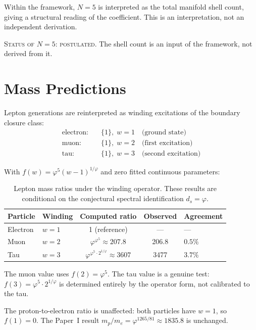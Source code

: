 \documentclass[12pt]{article}
\newcommand{\phig}{\varphi}
\newcommand{\ds}{d_s}
\begin{document}
Within the framework, $N = 5$ is interpreted as the total manifold shell count, giving a structural reading of the coefficient. This is an interpretation, not an independent derivation.

\textsc{Status of $N = 5$: postulated.} The shell count is an input of the framework, not derived from it.

\section{Mass Predictions}\label{sec:predictions}

Lepton generations are reinterpreted as winding excitations of the boundary closure class:
\begin{align}
    \text{electron:} \quad & \{1\},\; w = 1 \quad \text{(ground state)} \\
    \text{muon:} \quad & \{1\},\; w = 2 \quad \text{(first excitation)} \\
    \text{tau:} \quad & \{1\},\; w = 3 \quad \text{(second excitation)}
\end{align}

With $f(w) = \phig^5 (w{-}1)^{1/\phig}$ and zero fitted continuous parameters:

\begin{table}[ht]
\centering
\caption{Lepton mass ratios under the winding operator. These results are conditional on the conjectural spectral identification $\ds = \phig$.}
\label{tab:predictions}
\begin{tabular}{@{}llccl@{}}
\toprule
Particle & Winding & Computed ratio & Observed & Agreement \\
\midrule
Electron & $w = 1$ & 1 (reference) & --- & --- \\
Muon & $w = 2$ & $\phig^{\phig^5} \approx 207.8$ & 206.8 & $0.5\%$ \\
Tau & $w = 3$ & $\phig^{\phig^5 \cdot 2^{1/\phig}} \approx 3607$ & 3477 & $3.7\%$ \\
\bottomrule
\end{tabular}
\end{table}

The muon value uses $f(2) = \phig^5$. The tau value is a genuine test: $f(3) = \phig^5 \cdot 2^{1/\phig}$ is determined entirely by the operator form, not calibrated to the tau.

The proton-to-electron ratio is unaffected: both particles have $w = 1$, so $f(1) = 0$. The Paper~I result $m_p/m_e = \phig^{1265/81} \approx 1835.8$ is unchanged.
\end{document}
